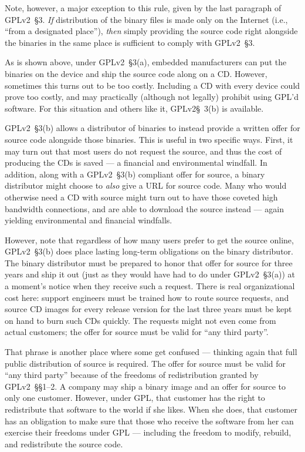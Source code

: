 Note, however, a major exception to this rule, given by the last paragraph
of GPLv2~\S3. \emph{If} distribution of the binary files is made only on the
Internet (i.e., ``from a designated place''), \emph{then} simply providing
the source code right alongside the binaries in the same place is
sufficient to comply with GPLv2~\S3.

\medskip

As is shown above, under GPLv2~\S3(a), embedded manufacturers can put the
binaries on the device and ship the source code along on a CD\@.  However,
sometimes this turns out to be too costly.  Including a CD with every
device could prove too costly, and may practically (although not legally)
prohibit using GPL'd software. For this situation and others like it, GPLv2\S~3(b) is available.

GPLv2~\S3(b) allows a distributor of binaries to instead provide a written
offer for source code alongside those binaries.  This is useful in two
specific ways.  First, it may turn out that most users do not request the
source, and thus the cost of producing the CDs is saved --- a financial
and environmental windfall.  In addition, along with a GPLv2~\S3(b) compliant
offer for source, a binary distributor might choose to \emph{also} give a
URL for source code.  Many who would otherwise need a CD with source might
turn out to have those coveted high bandwidth connections, and are able to
download the source instead --- again yielding environmental and financial
windfalls.

However, note that regardless of how many users prefer to get the
source online, GPLv2~\S3(b) does place lasting long-term obligations on the
binary distributor.  The binary distributor must be prepared to honor
that offer for source for three years and ship it out (just as they
would have had to do under GPLv2~\S3(a)) at a moment's notice when they
receive such a request.  There is real organizational cost here:
support engineers must be trained how to route source requests, and
source CD images for every release version for the last three years
must be kept on hand to burn such CDs quickly. The requests might not
even come from actual customers; the offer for source must be valid
for ``any third party''.

That phrase is another place where some get confused --- thinking again
that full public distribution of source is required.  The offer for source
must be valid for ``any third party'' because of the freedoms of
redistribution granted by GPLv2~\S\S1--2.  A company may ship a binary image
and an offer for source to only one customer.  However, under GPL, that
customer has the right to redistribute that software to the world if she
likes.  When she does, that customer has an obligation to make sure that
those who receive the software from her can exercise their freedoms under
GPL --- including the freedom to modify, rebuild, and redistribute the
source code.

